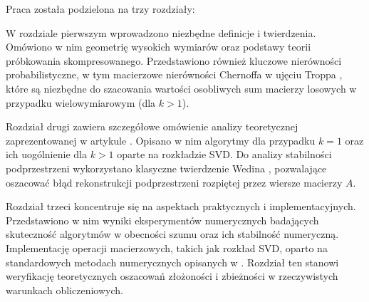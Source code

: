 Praca została podzielona na trzy rozdziały:

W rozdziale pierwszym wprowadzono niezbędne definicje i twierdzenia. Omówiono w nim geometrię wysokich wymiarów oraz podstawy teorii próbkowania skompresowanego. Przedstawiono również kluczowe nierówności probabilistyczne, w tym macierzowe nierówności Chernoffa w ujęciu Troppa \cite{tropp2012user}, które są niezbędne do szacowania wartości osobliwych sum macierzy losowych w przypadku wielowymiarowym (dla $k > 1$).

Rozdział drugi zawiera szczegółowe omówienie analizy teoretycznej zaprezentowanej w artykule \cite{fornasier2012learning}. Opisano w nim algorytmy dla przypadku $k=1$ oraz ich uogólnienie dla $k>1$ oparte na rozkładzie SVD. Do analizy stabilności podprzestrzeni wykorzystano klasyczne twierdzenie Wedina \cite{wedin1972perturbation}, pozwalające oszacować błąd rekonstrukcji podprzestrzeni rozpiętej przez wiersze macierzy $A$.

Rozdział trzeci koncentruje się na aspektach praktycznych i implementacyjnych. Przedstawiono w nim wyniki eksperymentów numerycznych badających skuteczność algorytmów w obecności szumu oraz ich stabilność numeryczną. Implementację operacji macierzowych, takich jak rozkład SVD, oparto na standardowych metodach numerycznych opisanych w \cite{golub1996matrix}. Rozdział ten stanowi weryfikację teoretycznych oszacowań złożoności i zbieżności w rzeczywistych warunkach obliczeniowych.